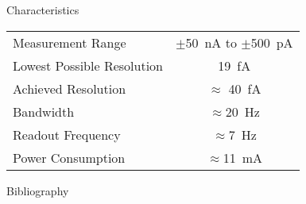 \documentclass[t]{beamer}
\begin{document}
\begin{frame}[c]{Characteristics}
				\begin{table}
	\begin{tabular}{lc}
		\hline
		Measurement Range & $\pm$\SI{50}{\nano\ampere} to $\pm$\SI{500}{\pico\ampere}  \\ 
		Lowest Possible Resolution & \SI{19}{\femto\ampere}  \\ 
		Achieved Resolution & $\approx$ \SI{40}{\femto\ampere}\\
		Bandwidth			& $\approx$\SI{20}{\hertz}  \\ 
		Readout Frequency& $\approx$\SI{7}{\hertz}  \\ 
		Power Consumption& $\approx$\SI{11}{\milli\ampere} \\ 
	\hline
	\end{tabular} 
\end{table}
\end{frame}

\begin{frame}[c,noframenumbering]{Bibliography}
	
\end{frame}
\end{document}
